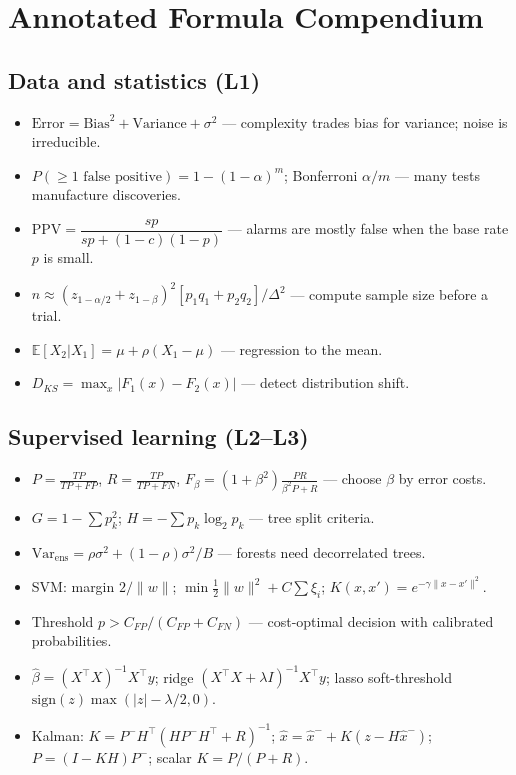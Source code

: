 \documentclass[11pt]{article}
\begin{document}
\section{Annotated Formula Compendium}
\subsection{Data and statistics (L1)}
\begin{itemize}
\item $\text{Error}=\text{Bias}^2+\text{Variance}+\sigma^2$ --- complexity trades bias for variance; noise is irreducible.
\item $P(\ge1\text{ false positive})=1-(1-\alpha)^m$; Bonferroni $\alpha/m$ --- many tests manufacture discoveries.
\item $\text{PPV}=\dfrac{sp}{sp+(1-c)(1-p)}$ --- alarms are mostly false when the base rate $p$ is small.
\item $n\approx(z_{1-\alpha/2}+z_{1-\beta})^2[p_1q_1+p_2q_2]/\Delta^2$ --- compute sample size before a trial.
\item $\mathbb E[X_2|X_1]=\mu+\rho(X_1-\mu)$ --- regression to the mean.
\item $D_{KS}=\max_x|F_1(x)-F_2(x)|$ --- detect distribution shift.
\end{itemize}
\subsection{Supervised learning (L2--L3)}
\begin{itemize}
\item $P=\frac{TP}{TP+FP}$, $R=\frac{TP}{TP+FN}$, $F_\beta=(1+\beta^2)\frac{PR}{\beta^2P+R}$ --- choose $\beta$ by error costs.
\item $G=1-\sum p_k^2$; $H=-\sum p_k\log_2p_k$ --- tree split criteria.
\item $\text{Var}_{\text{ens}}=\rho\sigma^2+(1-\rho)\sigma^2/B$ --- forests need decorrelated trees.
\item SVM: margin $2/\|w\|$; $\min\frac12\|w\|^2+C\sum\xi_i$; $K(x,x')=e^{-\gamma\|x-x'\|^2}$.
\item Threshold $p>C_{FP}/(C_{FP}+C_{FN})$ --- cost-optimal decision with calibrated probabilities.
\item $\hat\beta=(X^\top X)^{-1}X^\top y$; ridge $(X^\top X+\lambda I)^{-1}X^\top y$; lasso soft-threshold $\text{sign}(z)\max(|z|-\lambda/2,0)$.
\item Kalman: $K=P^-H^\top(HP^-H^\top+R)^{-1}$; $\hat x=\hat x^-+K(z-H\hat x^-)$; $P=(I-KH)P^-$; scalar $K=P/(P+R)$.
\end{itemize}
\end{document}

